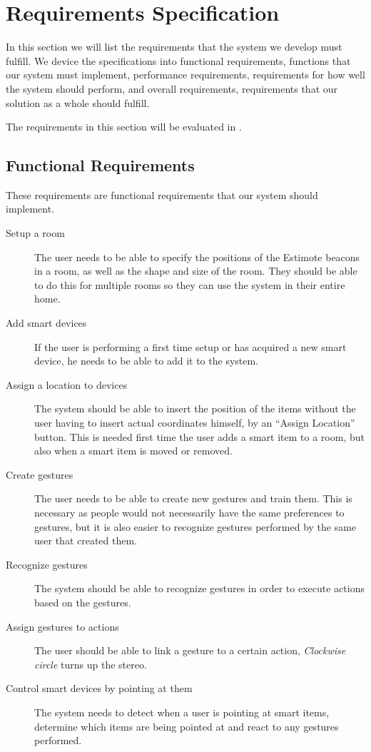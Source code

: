 \section{Requirements Specification}
\label{sec:requirements-specification}

In this section we will list the requirements that the system we develop must fulfill.
We device the specifications into functional requirements, 
\ie functions that our system must implement,
performance requirements,
\ie requirements for how well the system should perform,
and overall requirements, 
\ie requirements that our solution as a whole should fulfill.

The requirements in this section will be evaluated in .

\subsection{Functional Requirements}
These requirements are functional requirements that our system should implement.  
\begin{description}
    \item[Setup a room] The user needs to be able to specify the positions of the Estimote beacons in a room, as well as the shape and size of the room. They should be able to do this for multiple rooms so they can use the system in their entire home.
    \item[Add smart devices] If the user is performing a first time setup or has acquired a new smart device, he needs to be able to add it to the system. 
    \item[Assign a location to devices] The system should be able to insert the position of the items without the user having to insert actual coordinates himself, \eg by an ``Assign Location'' button. This is needed first time the user adds a smart item to a room, but also when a smart item is moved or removed.
    \item[Create gestures] The user needs to be able to create new gestures and train them. This is necessary as people would not necessarily have the same preferences to gestures, but it is also easier to recognize gestures performed by the same user that created them.
    \item[Recognize gestures] The system should be able to recognize gestures in order to execute actions based on the gestures.
    \item[Assign gestures to actions] The user should be able to link a gesture to a certain action, \eg \textit{Clockwise circle} turns up the stereo.
    \item[Control smart devices by pointing at them] The system needs to detect when a user is pointing at smart items, determine which items are being pointed at and react to any gestures performed.
\end{description}

